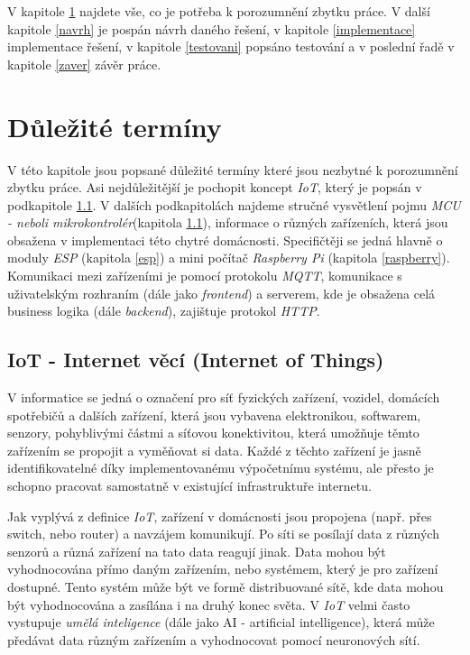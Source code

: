 V kapitole \ref{terminy} najdete vše, co je potřeba k porozumnění zbytku práce. V další kapitole \ref{navrh} je pospán návrh daného řešení, v kapitole \ref{implementace} implementace řešení, v kapitole \ref{testovani} popsáno testování a v poslední řadě v kapitole \ref{zaver} závěr práce.

\chapter{Důležité termíny}
\label{terminy}

V této kapitole jsou popsané důležité termíny které jsou nezbytné k porozumnění zbytku práce.
Asi nejdůležitější je pochopit koncept \emph{IoT}, který je popsán v podkapitole \ref{terminy:iot}.
V dalších podkapitolách najdeme stručné vysvětlení pojmu \emph{MCU - neboli mikrokontrolér}(kapitola \ref{terminy:iot}), informace o různých zařízeních, která jsou obsažena v implementaci této chytré domácnosti.
Specifičtěji se jedná hlavně o moduly \emph{ESP} (kapitola \ref{esp}) a mini počítač \emph{Raspberry Pi} (kapitola \ref{raspberry}).
Komunikaci mezi zařízeními je pomocí protokolu \emph{MQTT}, komunikace s uživatelským rozhraním (dále jako \emph{frontend}) a serverem, kde je obsažena celá business logika (dále \emph{backend}), zajištuje protokol \emph{HTTP}.

\bigskip

\section{IoT - Internet věcí (Internet of Things)}
\label{terminy:iot}

V informatice se jedná o označení pro síť fyzických zařízení, vozidel, domácích spotřebičů a dalších zařízení, která jsou vybavena elektronikou,
softwarem, senzory, pohyblivými částmi a síťovou konektivitou, která umožňuje těmto zařízením se propojit a vyměňovat si data.
Každé z těchto zařízení je jasně identifikovatelné díky implementovanému výpočetnímu systému,
ale přesto je schopno pracovat samostatně v existující infrastruktuře internetu.~\cite{wiki:iot}

Jak vyplývá z definice \emph{IoT}, zařízení v domácnosti jsou propojena (např. přes switch, nebo router) a navzájem komunikují. Po síti se posílají data z různých senzorů a různá zařízení na tato data reagují jinak.
Data mohou být vyhodnocována přímo daným zařízením, nebo systémem, který je pro zařízení dostupné. Tento systém může být ve formě distribuované sítě, kde data mohou být vyhodnocována a zasílána i na druhý konec světa.
V \emph{IoT} velmi často vystupuje \emph{umělá inteligence} (dále jako AI - artificial intelligence), která může předávat data různým zařízením a vyhodnocovat pomocí neuronových sítí.

